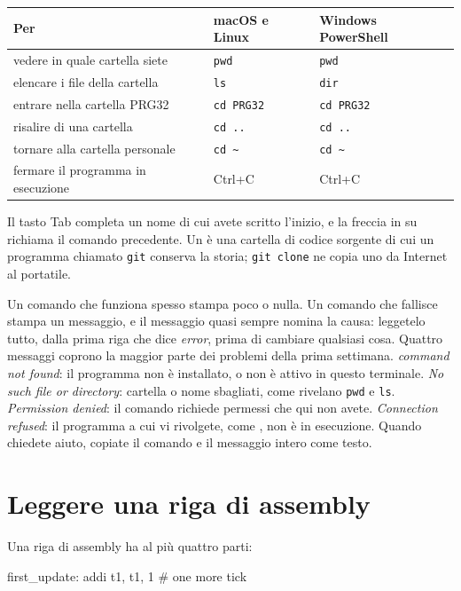 \begin{center}\small
\begin{tabular}{lll}
\toprule
\textbf{Per} & \textbf{macOS e Linux} & \textbf{Windows PowerShell}\\
\midrule
vedere in quale cartella siete & \texttt{pwd} & \texttt{pwd}\\
elencare i file della cartella & \texttt{ls} & \texttt{dir}\\
entrare nella cartella PRG32 & \texttt{cd PRG32} & \texttt{cd PRG32}\\
risalire di una cartella & \texttt{cd ..} & \texttt{cd ..}\\
tornare alla cartella personale & \texttt{cd \textasciitilde} & \texttt{cd \textasciitilde}\\
fermare il programma in esecuzione & Ctrl+C & Ctrl+C\\
\bottomrule
\end{tabular}
\end{center}

\noindent Il tasto Tab completa un nome di cui avete scritto l'inizio, e la
freccia in su richiama il comando precedente. Un  è una
cartella di codice sorgente di cui un programma chiamato \texttt{git} conserva
la storia; \texttt{git clone} ne copia uno da Internet al portatile.

Un comando che funziona spesso stampa poco o nulla. Un comando che fallisce
stampa un messaggio, e il messaggio quasi sempre nomina la causa: leggetelo
tutto, dalla prima riga che dice \emph{error}, prima di cambiare qualsiasi cosa.
Quattro messaggi coprono la maggior parte dei problemi della prima settimana.
\emph{command not found}: il programma non è installato, o non è attivo in
questo terminale. \emph{No such file or directory}: cartella o nome sbagliati,
come rivelano \texttt{pwd} e \texttt{ls}. \emph{Permission denied}: il comando
richiede permessi che qui non avete. \emph{Connection refused}: il programma a
cui vi rivolgete, come \prgqt, non è in esecuzione. Quando chiedete aiuto,
copiate il comando e il messaggio intero come testo.

\section*{Leggere una riga di assembly}

Una riga di assembly ha al più quattro parti:

\begin{asm}
first_update:   addi t1, t1, 1      # one more tick
\end{asm}

